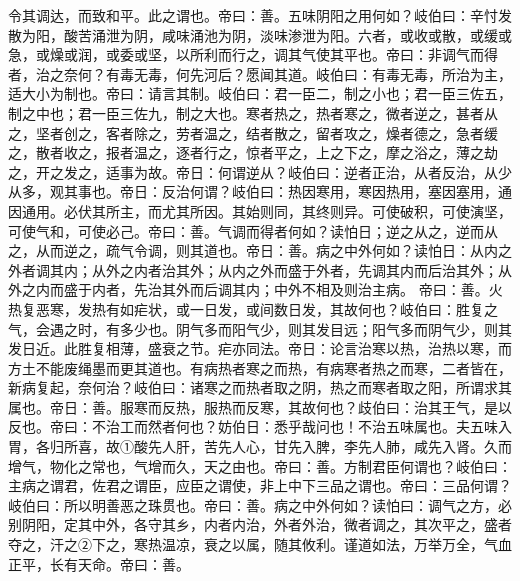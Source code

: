\documentclass[a4paper,12pt,UTF8,twoside]{ctexbook}
\begin{document}
令其调达，而致和平。此之谓也。帝曰：善。五味阴阳之用何如？岐伯曰：辛忖发散为阳，酸苦涌泄为阴，咸味涌池为阴，淡味渗泄为阳。六者，或收或散，或缓或急，或燥或润，或委或坚，以所利而行之，调其气使其平也。帝曰：非调气而得者，治之奈何？有毒无毒，何先河后？愿闻其道。岐伯曰：有毒无毒，所治为主，适大小为制也。帝曰：请言其制。岐伯曰：君一臣二，制之小也；君一臣三佐五，制之中也；君一臣三佐九，制之大也。寒者热之，热者寒之，微者逆之，甚者从之，坚者创之，客者除之，劳者温之，结者散之，留者攻之，燥者德之，急者缓之，散者收之，报者温之，逐者行之，惊者平之，上之下之，摩之浴之，薄之劫之，开之发之，适事为故。帝日：何谓逆从？岐伯曰：逆者正治，从者反治，从少从多，观其事也。帝日：反治何谓？岐伯曰：热因寒用，寒因热用，塞因塞用，通因通用。必伏其所主，而尤其所因。其始则同，其终则异。可使破积，可使演坚，可使气和，可使必己。帝曰：善。气调而得者何如？读怕日；逆之从之，逆而从之，从而逆之，疏气令调，则其道也。帝日：善。病之中外何如？读怕日：从内之外者调其内；从外之内者治其外；从内之外而盛于外者，先调其内而后治其外；从外之内而盛于内者，先治其外而后调其内；中外不相及则治主病。
帝曰：善。火热复恶寒，发热有如疟状，或一日发，或间数日发，其故何也？岐伯曰：胜复之气，会遇之时，有多少也。阴气多而阳气少，则其发目远；阳气多而阴气少，则其发日近。此胜复相薄，盛衰之节。疟亦同法。帝日：论言治寒以热，治热以寒，而方土不能废绳墨而更其道也。有病热者寒之而热，有病寒者热之而寒，二者皆在，新病复起，奈何治？岐伯曰：诸寒之而热者取之阴，热之而寒者取之阳，所谓求其属也。帝日：善。服寒而反热，服热而反寒，其故何也？歧伯曰：治其王气，是以反也。帝曰：不治工而然者何也？妨伯日：悉乎哉问也！不治五味属也。夫五味入胃，各归所喜，故①酸先人肝，苦先人心，甘先入脾，李先人肺，咸先入肾。久而增气，物化之常也，气增而久，天之由也。帝曰：善。方制君臣何谓也？岐伯曰：主病之谓君，佐君之谓臣，应臣之谓使，非上中下三品之谓也。帝曰：三品何谓？岐伯曰：所以明善恶之珠贯也。帝曰：善。病之中外何如？读怕曰：调气之方，必别阴阳，定其中外，各守其乡，内者内治，外者外治，微者调之，其次平之，盛者夺之，汗之②下之，寒热温凉，衰之以属，随其攸利。谨道如法，万举万全，气血正平，长有天命。帝曰：善。
\end{document}
